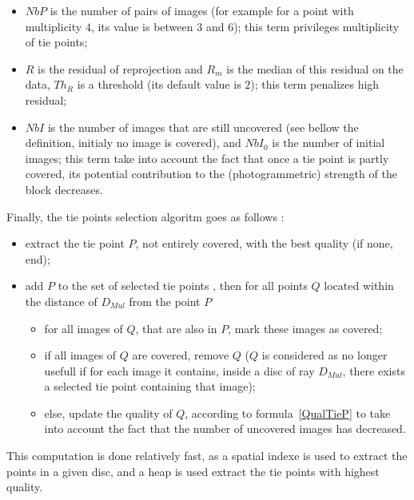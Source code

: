 \begin{itemize}
   \item $NbP$ is the number of pairs of images (for example for a point with multiplicity $4$,
         its value is between $3$ and $6$); this term privileges multiplicity of tie points;

   \item $R$ is the residual of reprojection and $R_m$ is the median of this residual on the data,
         $Th_R$ is a threshold (its default value is $2$); this term penalizes  high residual;

   \item $NbI$ is the number of images that are still uncovered (see bellow the definition, initialy no image is covered),
        and $NbI_0$ is the number of initial images; this term take into account the fact that once
        a tie point is partly covered, its potential contribution to the (photogrammetric) strength of the block decreases.

\end{itemize}

Finally, the tie points selection algoritm goes as follows :

\begin{itemize}
   \item extract the tie point $P$, not entirely covered, with the best quality (if none, end);
   \item add   $P$ to the set of selected tie points , then for all points $Q$ located within the distance of $D_{Mul}$ from the point $P$
         

   \begin{itemize}
         \item  for all images of $Q$, that are also in $P$, mark these images as covered;
         \item  if all images of $Q$ are covered, remove $Q$ ($Q$ is considered as no longer usefull if
                for each image  it contains, inside  a disc of ray $D_{Mul}$, there exists a selected tie point
                containing that image);
         \item  else, update the quality of  $Q$, according to formula~\ref{QualTieP} to take into account
                the fact that the number of uncovered images has decreased.
   \end{itemize}
\end{itemize}

This computation is done relatively fast, as a spatial indexe is used to extract the points in
a given disc, and a heap is used extract the tie points with highest quality. 

